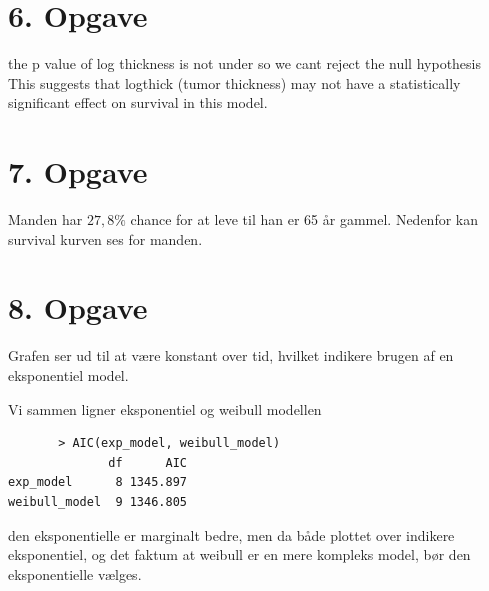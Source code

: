 \chapter{6. Opgave}
the p value of log thickness is not under so we cant reject the null hypothesis
This suggests that logthick (tumor thickness) may not have a statistically
significant effect on survival in this model.
\chapter{7. Opgave}
Manden har $27,8\%$ chance for at leve til han er 65 år gammel. 
Nedenfor kan survival kurven ses for manden.


\chapter{8. Opgave}
Grafen ser ud til at være konstant over tid, hvilket indikere brugen af en eksponentiel model.

Vi sammen ligner eksponentiel og weibull modellen
\begin{lstlisting}
       > AIC(exp_model, weibull_model)
              df      AIC
exp_model      8 1345.897
weibull_model  9 1346.805 
\end{lstlisting}
den eksponentielle er marginalt bedre, men da både plottet over indikere eksponentiel, og det faktum at weibull er en mere kompleks model, bør den eksponentielle vælges.